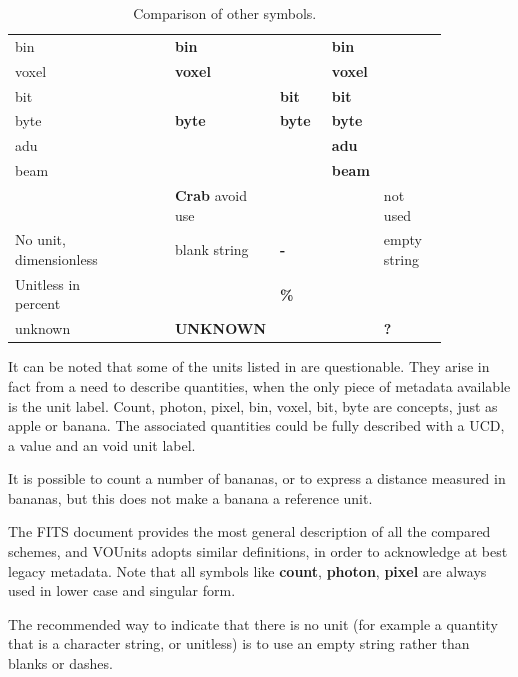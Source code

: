 \documentclass[12pt,notitlepage,onecolumn]{ivoa}
\newcommand{\unit}[1]{\textbf{\textsf{\color{orange}#1}}}
\begin{document}
\begin{table}
\begin{tabular}{|p{0.2\linewidth}|p{0.15\linewidth}|p{0.12\linewidth}|p{0.12\linewidth}|p{0.12\linewidth}|p{0.15\linewidth}|}
    bin & \unit{} & \unit{bin} & \unit{} & \unit{bin} &\\\cline{1-5}
    voxel & \unit{} & \unit{voxel} & \unit{} & \unit{voxel} &\\\cline{1-5}
    bit & \unit{} & \unit{} & \unit{bit} & \unit{bit} &\\\cline{1-5}
    byte & \unit{} & \unit{byte} & \unit{byte} & \unit{byte} &\\\cline{1-5}
    adu & \unit{} & \unit{} & \unit{} & \unit{adu} &\\\cline{1-5}
    beam & \unit{} & \unit{} & \unit{} & \unit{beam} &\\\hline
     & \unit{} & \unit{Crab} avoid use & \unit{} & \unit{} & not used \\\hline
    No unit, dimensionless & \unit{} & blank string & \unit{-} & \unit{} & empty string \\\hline
    Unitless in percent & \unit{} &  & \unit{\%} & \unit{} & \unit{} \\\hline
    unknown & \unit{} & \unit{UNKNOWN} & \unit{} & \unit{} & \unit{?} \\\hline
\end{tabular}
  \caption{Comparison of other symbols.}
  \label{tab:comparUnitOther}
\end{table}

It can be noted that some of the units listed in  are 
questionable. They arise in fact from a need to describe quantities, when the only
piece of metadata available is the unit label. Count, photon, pixel, bin, voxel, bit,
byte are concepts, just as apple or banana. The associated quantities could be fully
described with a UCD, a value and an void unit label.

It is possible to count a number of bananas, or to express a distance measured in
bananas, but this does not make a banana a reference unit.

The FITS document provides the most general description of all the compared schemes, 
and VOUnits adopts similar definitions, in order to acknowledge at best legacy metadata.
Note that all symbols like \unit{count}, \unit{photon}, \unit{pixel} are always used
in lower case and singular form.

The recommended way to indicate that there is no unit (for example a quantity that
is a character string, or unitless) is to use an empty string rather than blanks
or dashes.
\end{document}
